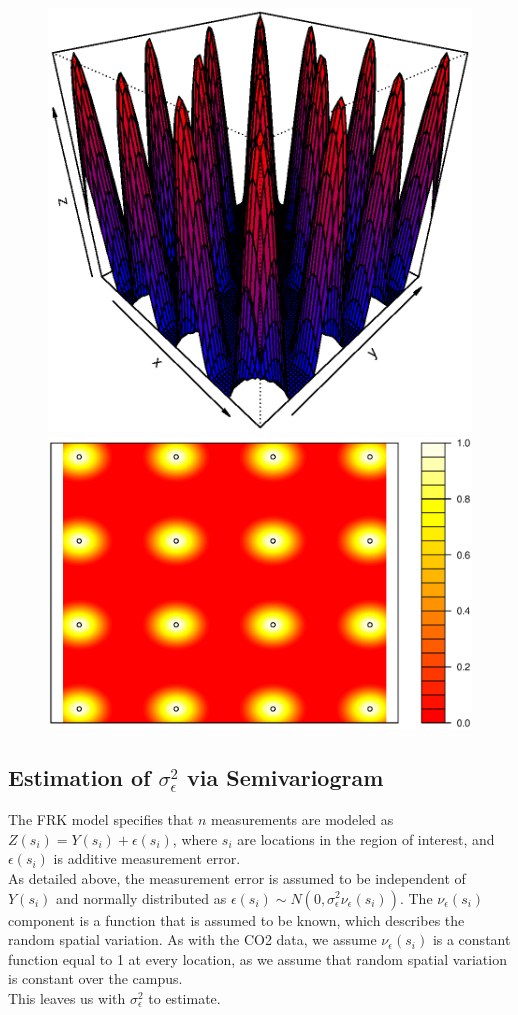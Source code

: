 \documentclass[11pt]{article}
\begin{document}
\begin{figure}[!ht]
\centering
\includegraphics[width=0.55\columnwidth]{./Images/res3}
\includegraphics[width=0.44\columnwidth]{./Images/res31}
\caption{}
\label{fig:res3}
\end{figure}

\subsection{Estimation of $\sigma^2_{\epsilon}$ via Semivariogram}

The FRK model specifies that $n$ measurements are modeled as $Z(s_i) = Y(s_i) + \epsilon(s_i)$, where $s_i$ are locations in the region of interest, and $\epsilon(s_i)$ is additive measurement error.\\

As detailed above, the measurement error is assumed to be independent of $Y(s_i)$ and normally distributed as $\epsilon(s_i) \sim N(0,\sigma^2_\epsilon \nu_\epsilon (s_i))$.  The $\nu_\epsilon (s_i)$ component is a function that is assumed to be known, which describes the random spatial variation.  As with the CO2 data, we assume $\nu_\epsilon (s_i)$ is a constant function equal to 1 at every location, as we assume that random spatial variation is constant over the campus. \\

This leaves us with $\sigma^2_\epsilon$ to estimate. \\
\end{document}

